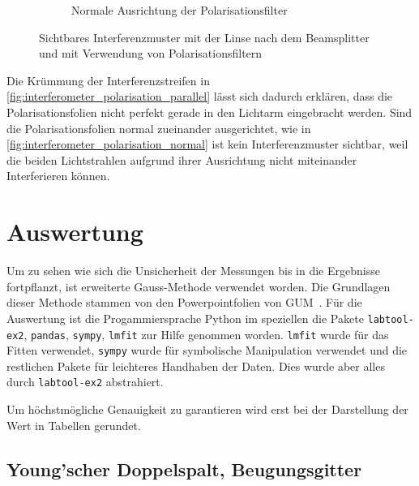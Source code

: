 \documentclass[12pt,english,ngerman]{scrartcl}
\begin{document}
\begin{figure}[H]
\begin{subfigure}{.45\linewidth}
		\caption{Normale Ausrichtung der Polarisationsfilter
		}\label{fig:interferometer_polarisation_normal}
	\end{subfigure}
	\caption[Sichtbares Interferenzmuster mit der Linse nach dem Beamsplitter und mit
		Verwendung von Polarisationsfiltern] {Sichtbares Interferenzmuster mit der
		Linse nach dem Beamsplitter und mit Verwendung von Polarisationsfiltern
	}\label{fig:interferometer_polarisation}
\end{figure}

Die Krümmung der Interferenzstreifen in
\autoref{fig:interferometer_polarisation_parallel} lässt sich dadurch erklären,
dass die Polarisationsfolien nicht perfekt gerade in den Lichtarm eingebracht
werden. Sind die Polarisationsfolien normal zueinander ausgerichtet, wie in
\autoref{fig:interferometer_polarisation_normal} ist kein Interferenzmuster
sichtbar, weil die beiden Lichtstrahlen aufgrund ihrer Ausrichtung nicht
miteinander Interferieren können.

\section{Auswertung}\label{sec:auswertung}

Um zu sehen wie sich die Unsicherheit der Messungen bis in die Ergebnisse
fortpflanzt, ist erweiterte Gauss-Methode verwendet worden. Die Grundlagen
dieser Methode stammen von den Powerpointfolien von
GUM~\cite{wolfgang_kessel_isobipm-gum_2004}. Für die Auswertung ist die
Progammiersprache Python im speziellen die Pakete \verb#labtool-ex2#,
\verb#pandas#, \verb#sympy#, \verb#lmfit# zur Hilfe genommen worden.
\verb#lmfit# wurde für das Fitten verwendet, \verb#sympy# wurde für symbolische
Manipulation verwendet und die restlichen Pakete für leichteres Handhaben der
Daten. Dies wurde aber alles durch \verb#labtool-ex2# abstrahiert.

Um höchstmögliche Genauigkeit zu garantieren wird erst bei der Darstellung der
Wert in Tabellen gerundet.

\subsection{Young'scher Doppelspalt, Beugungsgitter}

\end{document}
